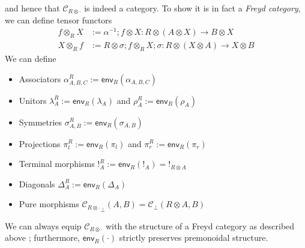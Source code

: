 \documentclass[acmsmall,screen,review]{acmart}
\newcommand{\mc}[1]{\ensuremath{\mathcal{#1}}}
\newcommand{\ms}[1]{\ensuremath{\mathsf{#1}}}
\newcommand{\envcom}[2]{{#1}_{#2 \otimes \cdot}}
\newcommand{\toenv}[2]{\ms{env}_{#1}(#2)}
\newcommand{\envtn}[3]{{#2} \otimes_{#1} {#3}}
\begin{document}
and hence that $\envcom{\mc{C}}{R}$ is indeed a category. To show it is in fact a \emph{Freyd
category}, we can define tensor functors
\begin{equation}
  \begin{aligned}
  \envtn{R}{f}{X} &:= \alpha^{-1} ; f \otimes X 
    : R \otimes (A \otimes X) \to B \otimes X \\
  \envtn{R}{X}{f} &:= R \otimes \sigma ; \envtn{R}{f}{X} ; \sigma
    : R \otimes (X \otimes A) \to X \otimes B
  \end{aligned}
\end{equation}
We can define
\begin{itemize}
  \item Associators $\alpha^R_{A, B, C} := \toenv{R}{\alpha_{A, B, C}}$
  \item Unitors $\lambda^R_A := \toenv{R}{\lambda_A}$ and $\rho^R_A := \toenv{R}{\rho_A}$
  \item Symmetries $\sigma^R_{A, B} := \toenv{R}{\sigma_{A, B}}$
  \item Projections $\pi_l^R := \toenv{R}{\pi_l}$ and $\pi_r^R := \toenv{R}{\pi_r}$
  \item Terminal morphisms $!^R_A := \toenv{R}{!_A} = !_{R \otimes A}$
  \item Diagonals $\Delta^R_A := \toenv{R}{\Delta_A}$
  \item Pure morphisms ${\envcom{\mc{C}}{R}}_\bot(A, B) = \mc{C}_{\bot}(R \otimes A, B)$
\end{itemize}
\begin{lemma}
  We can always equip $\envcom{\mc{C}}{R}$ with the structure of a Freyd category as described above
  ; furthermore, $\toenv{R}{\cdot}$ strictly preserves premonoidal structure.
\end{lemma}
\end{document}
